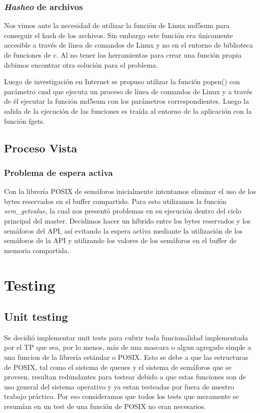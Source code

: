 \documentclass[10pt,a4paper]{report}
\begin{document}
\subsection{\textit{Hasheo} de archivos}
Nos vimos ante la necesidad de utilizar la función de Linux md5sum para conseguir el hash de los archivos. Sin embargo este función
era únicamente accesible a través de línea de comandos de Linux y no en el entorno de biblioteca de funciones de c. Al no tener las
herramientas para crear una función propia debimos encontrar otra solución para el problema.

Luego de investigación en Internet se propuso utilizar la función popen() con parámetro cmd que ejecuta un proceso de línea de comandos
de Linux y a través de él ejecutar la función md5sum con los parámetros correspondientes. Luego la salida de la ejecución de las funciones
es traída al entorno de la aplicación con la función fgets.
\section{Proceso Vista}
\subsection{Problema de espera activa}
	Con la librería POSIX de semáforos inicialmente intentamos eliminar el uso de los bytes reservados en el buffer compartido. Para esto utilizamos la función \textit{sem\_getvalue}, la cual nos presentó problemas en su ejecución dentro del ciclo principal del master. Decidimos hacer un híbrido entre los bytes reservados y los semáforos del API, así evitando la espera activa mediante la utilización de los semáforos de la API y utilizando los valores de los semáforos en el buffer de memoria compartida.


\chapter{Testing}
\section{Unit testing}
Se decidió implementar unit tests para cubrir toda funcionalidad implementada por el TP que sea, por lo menos, más de una mascara o algun agregado simple a una funcion de la librería estándar o POSIX. 
Esto se debe a que las estructuras de POSIX, tal como el sistema de queues y el sistema de semáforos que se proveen, resultan redundantes para testear debido a que estas funciones son de uso general del sistema operativo y ya estan testeadas por fuera de nuestro trabajo práctico. Por eso consideramos que todos los tests que meramente se resumían en un test de una función de POSIX no eran necesarios.
\end{document}
